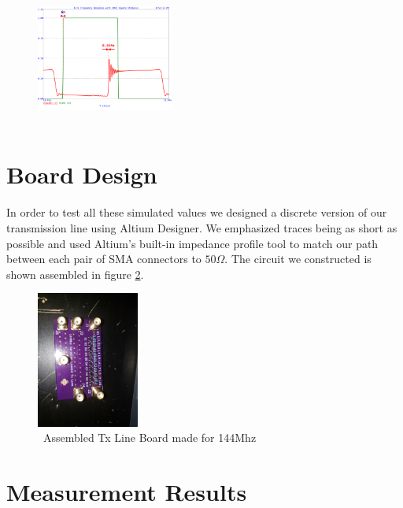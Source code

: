 \documentclass[journal]{IEEEtran}
\begin{document}
\begin{figure}[htb]
\centering
\includegraphics[width=0.4\textwidth,page={1}]{Probed_Input_N10_N240_With_SeriesResistance.pdf}
\caption{\
}\label{fig:ProbedTransientYesSer}
\end{figure}





\section{Board Design} 


In order to test all these simulated values we designed a discrete version of our transmission line using Altium Designer. We emphasized traces being as short as possible and used Altium's built-in impedance profile tool to match our path between each pair of SMA connectors to $50\Omega$. The circuit we constructed is shown assembled in figure \ref{fig:assembled}.


\begin{figure}[htb]
\centering
\includegraphics[width=0.3\textwidth, angle = 90]{AssembledBoard.jpg}
\caption{\ Assembled Tx Line Board made for 144Mhz
}\label{fig:assembled}
\end{figure}





\section{ Measurement Results }
\end{document}
